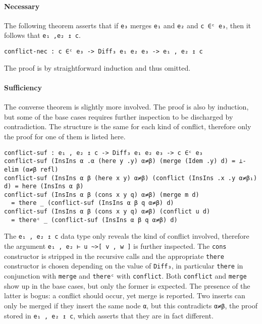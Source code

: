\documentclass[../Thesis.tex]{subfiles}
\begin{document}
	\paragraph{Necessary}
	\label{par:ConflictNec}
	The following theorem asserts that if \texttt{e₃} merges \texttt{e₁} and
	\texttt{e₂} and \texttt{c ∈ᶜ e₃}, then it follows that \texttt{e₁ ,e₂ ↥ c}.
	
\begin{verbatim}
conflict-nec : c ∈ᶜ e₃ -> Diff₃ e₁ e₂ e₃ -> e₁ , e₂ ↥ c
\end{verbatim}

	The proof is by straightforward induction and thus omitted.

	\paragraph{Sufficiency}
	The converse theorem is slightly more involved.
	The proof is also by induction, but some of the base cases requires further 
	inspection to be discharged by contradiction.
	The structure is the same for each kind of conflict, therefore only the
	proof for one of them is listed here.
	
\begin{verbatim}
conflict-suf : e₁ , e₂ ↥ c -> Diff₃ e₁ e₂ e₃ -> c ∈ᶜ e₃
conflict-suf (InsIns α .α (here y .y) α≠β) (merge (Idem .y) d) = ⊥-elim (α≠β refl)
conflict-suf (InsIns α β (here x y) α≠β) (conflict (InsIns .x .y α≠β₁) d) = here (InsIns α β)
conflict-suf (InsIns α β (cons x y q) α≠β) (merge m d) 
  = there _ (conflict-suf (InsIns α β q α≠β) d)
conflict-suf (InsIns α β (cons x y q) α≠β) (conflict u d) 
  = thereᶜ _ (conflict-suf (InsIns α β q α≠β) d)
\end{verbatim}

The \texttt{e₁ , e₂ ↥ c} data type only reveals the kind of conflict involved,
therefore the argument \texttt{e₁ , e₂ ⊢ u \textasciitilde>[ v , w ]} 
is further inspected.
The \texttt{cons}  constructor is stripped in the recursive 
calls and the appropriate \texttt{there} constructor is chosen depending on 
the value of \texttt{Diff₃}, in particular \texttt{there} in conjunction with 
\texttt{merge} and \texttt{thereᶜ} with \texttt{conflict}.
Both \texttt{conflict} and \texttt{merge} show up in the base cases, but only
the former is expected.
The presence of the latter is bogus: a conflict should occur, yet merge is reported. Two inserts can only be merged if they insert the same node \texttt{α}, but this contradicts \texttt{α≠β}, the proof stored in 
\texttt{e₁ , e₂ ↥ c}, which asserts that they are in fact different.
\end{document}
